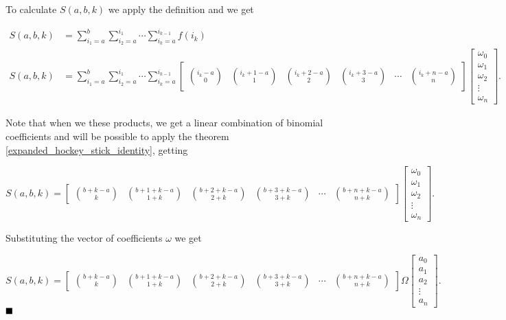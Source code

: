 \documentclass[12pt]{article}
\begin{document}
To calculate $S(a, b, k)$ we apply the definition and we get

\begin{align*}
    S(a, b, k) & = \sum_{i_1=a}^{b}\sum_{i_2=a}^{i_1} \cdots \sum_{i_k=a}^{i_{k-1}} f(i_k) \\
    S(a, b, k) & = \sum_{i_1=a}^{b}\sum_{i_2=a}^{i_1} \cdots \sum_{i_k=a}^{i_{k-1}}
    \begin{bmatrix}
        \binom{i_k-a}{0} & \binom{i_k+1-a}{1} & \binom{i_k+2-a}{2} & \binom{i_k+3-a}{3} & \cdots & \binom{i_k+n-a}{n}
    \end{bmatrix} \begin{bmatrix}
                      \omega_0 \\ \omega_1 \\ \omega_2 \\ \vdots \\ \omega_n
                  \end{bmatrix}.
\end{align*}

Note that when we these products, we get a linear combination of binomial coefficients and will be possible to apply the theorem \ref{expanded_hockey_stick_identity}, getting




$$
    S(a, b, k) = \begin{bmatrix}
        \binom{b+k-a}{k} & \binom{b+1+k-a}{1+k} & \binom{b+2+k-a}{2+k} & \binom{b+3+k-a}{3+k} & \cdots & \binom{b+n+k-a}{n+k}
    \end{bmatrix} \begin{bmatrix}
        \omega_0 \\ \omega_1 \\ \omega_2 \\ \vdots \\ \omega_n
    \end{bmatrix}.
$$

Substituting the vector of coefficients $\omega$ we get

$$
    \boxed{S(a, b, k) =
        \begin{bmatrix}
            \binom{b+k-a}{k} & \binom{b+1+k-a}{1+k} & \binom{b+2+k-a}{2+k} & \binom{b+3+k-a}{3+k} & \cdots & \binom{b+n+k-a}{n+k}
        \end{bmatrix} \Omega
        \begin{bmatrix}
            a_0 \\ a_1 \\ a_2 \\ \vdots \\ a_n
        \end{bmatrix}}.
$$
$\hfill\blacksquare$
\end{document}
